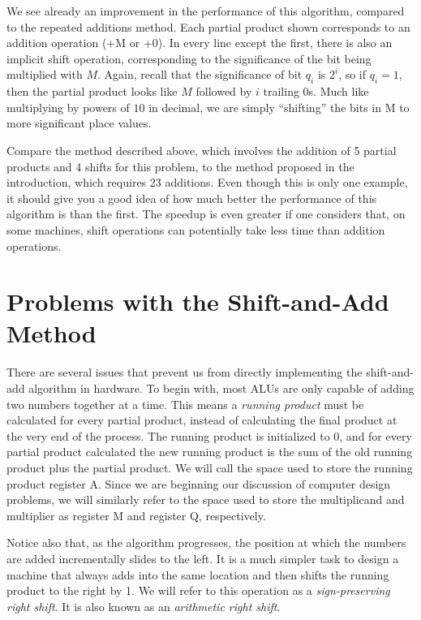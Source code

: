 \documentclass{article}
\begin{document}
We see already an improvement in the performance of this algorithm, compared to the repeated additions method.
Each partial product shown corresponds to an addition operation (+M or +0).
In every line except the first, there is also an implicit shift operation, corresponding to the significance of the bit being multiplied with $M$.
Again, recall that the significance of bit $q_i$ is $2^i$, so if $q_i = 1$, then the partial product looks like $M$ followed by $i$ trailing 0s.
Much like multiplying by powers of $10$ in decimal, we are simply ``shifting'' the bits in M to more significant place values.

Compare the method described above, which involves the addition of 5 partial products and 4 shifts for this problem, to the method proposed in the introduction, which requires 23 additions.
Even though this is only one example, it should give you a good idea of how much better the performance of this algorithm is than the first.
The speedup is even greater if one considers that, on some machines, shift operations can potentially take less time than addition operations.

\section{Problems with the Shift-and-Add Method}
There are several issues that prevent us from directly implementing the shift-and-add algorithm in hardware.
To begin with, most ALUs are only capable of adding two numbers together at a time.
This means a \emph{running product} must be calculated for every partial product, instead of calculating the final product at the very end of the process.
The running product is initialized to 0, and for every partial product calculated the new running product is the sum of the old running product plus the partial product.
We will call the space used to store the running product register A.
Since we are beginning our discussion of computer design problems, we will similarly refer to the space used to store the multiplicand and multiplier as register M and register Q, respectively.

Notice also that, as the algorithm progresses, the position at which the numbers are added incrementally slides to the left.
It is a much simpler task to design a machine that always adds into the same location and then shifts the running product to the right by 1.
We will refer to this operation as a \emph{sign-preserving right shift}.
It is also known as an \emph{arithmetic right shift}.
\end{document}

